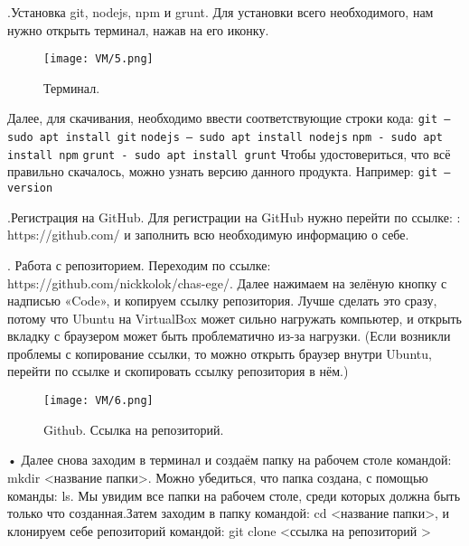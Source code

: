 .\quad Установка git, nodejs, npm и grunt.
\newline Для установки всего необходимого, нам нужно открыть терминал, нажав на его иконку. 

\begin{figure}[h]
		\centering
		\texttt{[image: VM/5.png]}
\caption{Терминал.}
\label{ris:image}
\end{figure}

\quad Далее, для скачивания, необходимо ввести соответствующие строки кода:
\newline \texttt{git – sudo apt install git}
\newline \texttt{nodejs – sudo apt install nodejs}
\newline \texttt{npm - sudo apt install npm}
\newline \texttt{grunt - sudo apt install grunt}
\newline Чтобы удостовериться, что всё правильно скачалось, можно узнать версию данного продукта. Например: \texttt{git –version}

.\quad  Регистрация на GitHub.
\newline \quad Для регистрации на GitHub нужно перейти по ссылке: : https://github.com/ и заполнить всю необходимую информацию о себе.

. \quad Работа с репозиторием.
\newline \quad Переходим по ссылке: https://github.com/nickkolok/chas-ege/. Далее нажимаем на зелёную кнопку с надписью «Code», и копируем ссылку репозитория. Лучше сделать это сразу, потому что Ubuntu на VirtualBox может сильно нагружать компьютер, и открыть вкладку с браузером может быть проблематично из-за нагрузки. (Если возникли проблемы с копирование ссылки, то можно открыть браузер внутри Ubuntu, перейти по ссылке и скопировать ссылку репозитория в нём.)

\begin{figure}[h]
		\centering
		\texttt{[image: VM/6.png]}
\caption{Github. Ссылка на репозиторий.}
\label{ris:image}
\end{figure}

• Далее снова заходим в терминал и создаём папку на рабочем столе командой: mkdir <название папки>. Можно убедиться, что папка создана, с помощью команды: ls. Мы увидим все папки на рабочем столе, среди которых должна быть только что созданная.Затем заходим в папку командой: cd <название папки>, и клонируем себе репозиторий командой: git clone <ссылка на репозиторий >

